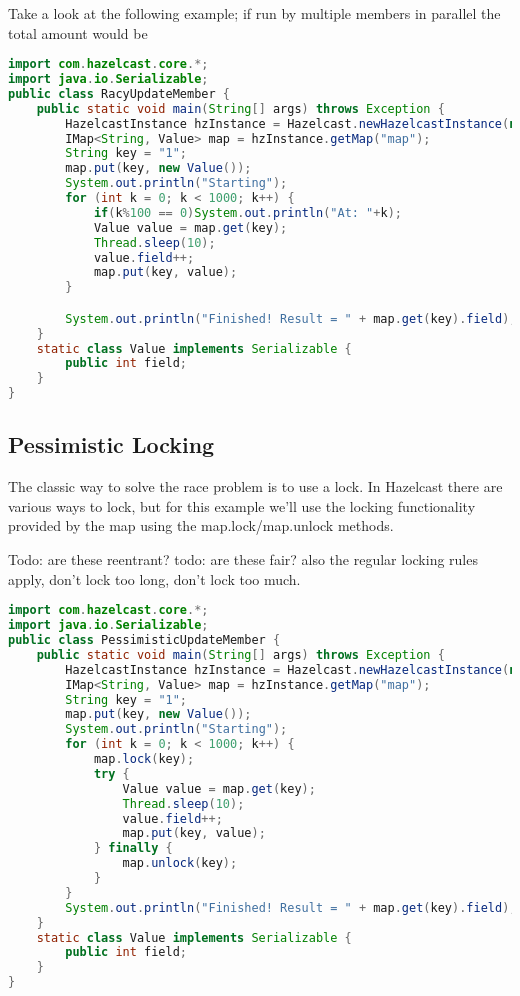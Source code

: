Take a look at the following example; if run by multiple members in parallel the total amount would be 
\begin{lstlisting}[language=java]
import com.hazelcast.core.*;
import java.io.Serializable;
public class RacyUpdateMember {
    public static void main(String[] args) throws Exception {
        HazelcastInstance hzInstance = Hazelcast.newHazelcastInstance(null);
        IMap<String, Value> map = hzInstance.getMap("map");
        String key = "1";
        map.put(key, new Value());
        System.out.println("Starting");
        for (int k = 0; k < 1000; k++) {
            if(k%100 == 0)System.out.println("At: "+k);
            Value value = map.get(key);
            Thread.sleep(10);
            value.field++;
            map.put(key, value);
        }

        System.out.println("Finished! Result = " + map.get(key).field);
    }
    static class Value implements Serializable {
        public int field;
    }
}
\end{lstlisting}

\subsection{Pessimistic Locking}
The classic way to solve the race problem is to use a lock. In Hazelcast there are various ways to lock, but for this example we'll use the locking functionality provided by the map using the map.lock/map.unlock methods.

Todo: are these reentrant?
todo: are these fair?
also the regular locking rules apply, don't lock too long, don't lock too much.

\begin{lstlisting}[language=java]
import com.hazelcast.core.*;
import java.io.Serializable;
public class PessimisticUpdateMember {
    public static void main(String[] args) throws Exception {
        HazelcastInstance hzInstance = Hazelcast.newHazelcastInstance(null);
        IMap<String, Value> map = hzInstance.getMap("map");
        String key = "1";
        map.put(key, new Value());
        System.out.println("Starting");
        for (int k = 0; k < 1000; k++) {
            map.lock(key);
            try {
                Value value = map.get(key);
                Thread.sleep(10);
                value.field++;
                map.put(key, value);
            } finally {
                map.unlock(key);
            }
        }
        System.out.println("Finished! Result = " + map.get(key).field);
    }
    static class Value implements Serializable {
        public int field;
    }
}
\end{lstlisting}

